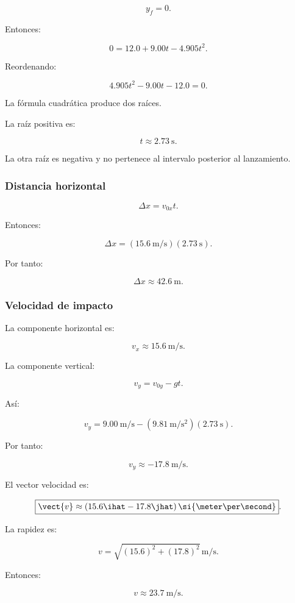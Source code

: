 \[
y_f=0.
\]

Entonces:

\[
0
=
12.0
+
9.00t
-
4.905t^2.
\]

Reordenando:

\[
4.905t^2
-
9.00t
-
12.0
=
0.
\]

La fórmula cuadrática produce dos raíces.

La raíz positiva es:

\[
\boxed{
t\approx\SI{2.73}{\second}
}.
\]

La otra raíz es negativa y no pertenece al intervalo posterior al lanzamiento.


\subsubsection*{Distancia horizontal}

\[
\Delta x=v_{0x}t.
\]

Entonces:

\[
\Delta x
=
(\SI{15.6}{\meter\per\second})
(\SI{2.73}{\second}).
\]

Por tanto:

\[
\boxed{
\Delta x\approx\SI{42.6}{\meter}
}.
\]


\subsubsection*{Velocidad de impacto}

La componente horizontal es:

\[
\boxed{
v_x\approx\SI{15.6}{\meter\per\second}
}.
\]

La componente vertical:

\[
v_y=v_{0y}-gt.
\]

Así:

\[
v_y
=
\SI{9.00}{\meter\per\second}
-
(\SI{9.81}{\meter\per\second\squared})
(\SI{2.73}{\second}).
\]

Por tanto:

\[
\boxed{
v_y\approx-\SI{17.8}{\meter\per\second}
}.
\]

El vector velocidad es:

\[
\boxed{
\vect{v}
\approx
(15.6\ihat-17.8\jhat)
\,\si{\meter\per\second}
}.
\]

La rapidez es:

\[
v
=
\sqrt{
(15.6)^2+(17.8)^2
}
\,\si{\meter\per\second}.
\]

Entonces:

\[
\boxed{
v\approx\SI{23.7}{\meter\per\second}
}.
\]

